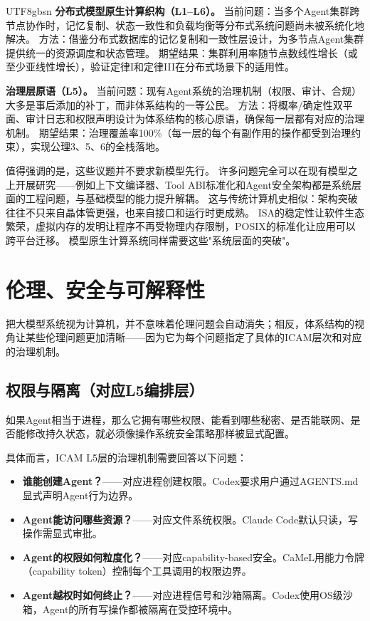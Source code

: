 \documentclass[11pt,a4paper]{article}
\begin{document}
\begin{CJK*}{UTF8}{gbsn}
\textbf{分布式模型原生计算织构（L1--L6）。}
当前问题：当多个Agent集群跨节点协作时，记忆复制、状态一致性和负载均衡等分布式系统问题尚未被系统化地解决。
方法：借鉴分布式数据库的记忆复制和一致性层设计\cite{spanner2012,raft2014}，为多节点Agent集群提供统一的资源调度和状态管理。
期望结果：集群利用率随节点数线性增长（或至少亚线性增长），验证定律I和定律III在分布式场景下的适用性。

\textbf{治理层原语（L5）。}
当前问题：现有Agent系统的治理机制（权限、审计、合规）大多是事后添加的补丁，而非体系结构的一等公民。
方法：将概率/确定性双平面、审计日志和权限声明设计为体系结构的核心原语\cite{arbiteros2025,ironclaw2025}，确保每一层都有对应的治理机制。
期望结果：治理覆盖率100\%（每一层的每个有副作用的操作都受到治理约束），实现公理3、5、6的全栈落地。

值得强调的是，这些议题并不要求新模型先行。
许多问题完全可以在现有模型之上开展研究——例如上下文编译器、Tool ABI标准化和Agent安全架构都是系统层面的工程问题，与基础模型的能力提升解耦。
这与传统计算机史相似：架构突破往往不只来自晶体管更强，也来自接口和运行时更成熟。
ISA的稳定性让软件生态繁荣，虚拟内存的发明让程序不再受物理内存限制，POSIX的标准化让应用可以跨平台迁移。
模型原生计算系统同样需要这些"系统层面的突破"。

\section{伦理、安全与可解释性}
\label{sec:ethics}

把大模型系统视为计算机，并不意味着伦理问题会自动消失；相反，体系结构的视角让某些伦理问题更加清晰——因为它为每个问题指定了具体的ICAM层次和对应的治理机制。

\subsection{权限与隔离（对应L5编排层）}

如果Agent相当于进程，那么它拥有哪些权限、能看到哪些秘密、是否能联网、是否能修改持久状态，就必须像操作系统安全策略那样被显式配置\cite{openai_codex_approvals_2026,openai_codex_sandbox_2026,anthropic_claudecode_security_2026,anthropic_claudecode_sandbox_2026,debenedetti2025camel,ironclaw2025}。

具体而言，ICAM L5层的治理机制需要回答以下问题：
\begin{itemize}[nosep]
\item \textbf{谁能创建Agent？}——对应进程创建权限。Codex要求用户通过AGENTS.md显式声明Agent行为边界\cite{openai_codex_agents_md_2026}。
\item \textbf{Agent能访问哪些资源？}——对应文件系统权限。Claude Code默认只读，写操作需显式审批\cite{anthropic_claudecode_security_2026}。
\item \textbf{Agent的权限如何粒度化？}——对应capability-based安全。CaMeL用能力令牌（capability token）控制每个工具调用的权限边界\cite{debenedetti2025camel}。
\item \textbf{Agent越权时如何终止？}——对应进程信号和沙箱隔离。Codex使用OS级沙箱，Agent的所有写操作都被隔离在受控环境中\cite{openai_codex_sandbox_2026}。
\end{itemize}


\end{CJK*}
\end{document}
